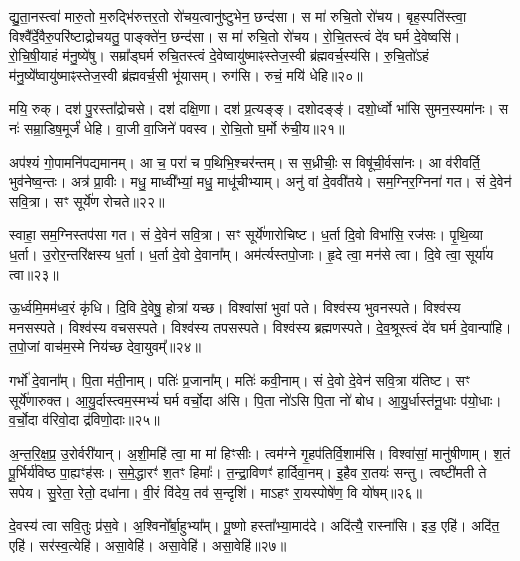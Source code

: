 द्यु॒ता॒नस्त्वा॑ मारु॒तो म॒रुद्भि॑रुत्तर॒तो रो॑चय॒त्वानु॑ष्टुभेन॒ छन्द॑सा। 
स मा॑ रुचि॒तो रो॑चय। 
बृह॒स्पति॑स्त्वा॒ विश्वै᳚र्दे॒वैरु॒परि॑ष्टाद्रोचयतु॒ पाङ्क्ते॑न॒ छन्द॑सा। 
स मा॑ रुचि॒तो रो॑चय। 
रो॒चि॒तस्त्वं दे॑व घर्म दे॒वेष्वसि॑। 
रो॒चि॒षी॒याहं म॑नु॒ष्ये॑षु। 
सम्रा᳚ड्घर्म रुचि॒तस्त्वं दे॒वेष्वायु॑ष्माꣴस्तेज॒स्वी ब्र॑ह्मवर्च॒स्य॑सि। 
रु॒चि॒तो॑ऽहं म॑नु॒ष्ये᳚ष्वायु॑ष्माꣴस्तेज॒स्वी ब्र॑ह्मवर्च॒सी भू॑यासम्। 
रुग॑सि। 
रुचं॒ मयि॑ धेहि॥२०॥

मयि॒ रुक्। 
दश॑ पु॒रस्ता᳚द्रोचसे। 
दश॑ दक्षि॒णा। 
दश॑ प्र॒त्यङ्ङ्। 
दशोदङ्ङ्॑। 
दशो॒र्ध्वो भा॑सि सुमन॒स्यमा॑नः। 
स नः॑ सम्रा॒डिष॒मूर्जं॑ धेहि। 
वा॒जी वा॒जिने॑ पवस्व। 
रो॒चि॒तो घ॒र्मो रु॑ची॒य॥२१॥
\anuvakamend[रो॒च॒य॒ धे॒हि॒ नव॑ च]

अप॑श्यं गो॒पामनि॑पद्यमानम्। 
आ च॒ परा॑ च प॒थिभि॒श्चर॑न्तम्। 
स स॒ध्रीचीः॒ स विषू॑ची॒र्वसा॑नः। 
आ व॑रीवर्ति॒ भुव॑नेष्व॒न्तः। 
अत्र॑ प्रा॒वीः। 
मधु॒ माध्वी᳚भ्यां॒ मधु॒ माधू॑चीभ्याम्। 
अनु॑ वां दे॒ववी॑तये। 
सम॒ग्निर॒ग्निना॑ गत। 
सं दे॒वेन॑ सवि॒त्रा। 
सꣳ सूर्ये॑ण रोचते॥२२॥

स्वाहा॒ सम॒ग्निस्तप॑सा गत। 
सं दे॒वेन॑ सवि॒त्रा। 
सꣳ सूर्ये॑णारोचिष्ट। 
ध॒र्ता दि॒वो विभा॑सि॒ रज॑सः। 
पृ॒थि॒व्या ध॒र्ता। 
उ॒रोर॒न्तरि॑क्षस्य ध॒र्ता। 
ध॒र्ता दे॒वो दे॒वाना᳚म्। 
अम॑र्त्यस्तपो॒जाः। 
हृ॒दे त्वा॒ मन॑से त्वा। 
दि॒वे त्वा॒ सूर्या॑य त्वा॥२३॥

ऊ॒र्ध्वमि॒मम॑ध्व॒रं कृ॑धि। 
दि॒वि दे॒वेषु॒ होत्रा॑ यच्छ। 
विश्वा॑सां भुवां पते। 
विश्व॑स्य भुवनस्पते। 
विश्व॑स्य मनसस्पते। 
विश्व॑स्य वचसस्पते। 
विश्व॑स्य तपसस्पते। 
विश्व॑स्य ब्रह्मणस्पते। 
दे॒व॒श्रूस्त्वं दे॑व घर्म दे॒वान्पा॑हि। 
त॒पो॒जां वाच॑म॒स्मे निय॑च्छ देवा॒युवम्᳚॥२४॥

गर्भो॑ दे॒वाना᳚म्। 
पि॒ता म॑ती॒नाम्। 
पतिः॑ प्र॒जाना᳚म्। 
मतिः॑ कवी॒नाम्। 
सं दे॒वो दे॒वेन॑ सवि॒त्रा य॑तिष्ट। 
सꣳ सूर्ये॑णारुक्त। 
आ॒यु॒र्दास्त्वम॒स्मभ्यं॑ घर्म वर्चो॒दा अ॑सि। 
पि॒ता नो॑ऽसि पि॒ता नो॑ बोध। 
आ॒यु॒र्धास्त॑नू॒धाः प॑यो॒धाः। 
व॒र्चो॒दा व॑रिवो॒दा द्र॑विणो॒दाः॥२५॥

अ॒न्त॒रि॒क्ष॒प्र॒ उ॒रोर्वरी॑यान्। 
अ॒शी॒महि॑ त्वा॒ मा मा॑ हिꣳसीः। 
त्वम॑ग्ने गृ॒हप॑तिर्वि॒शाम॑सि। 
विश्वा॑सां॒ मानु॑षीणाम्। 
श॒तं पू॒र्भिर्य॑विष्ठ पा॒ह्यꣳह॑सः। 
स॒मे॒द्धारꣳ॑ श॒तꣳ हिमाः᳚। 
त॒न्द्रा॒विणꣳ॑ हार्दिवा॒नम्। 
इ॒हैव रा॒तयः॑ सन्तु। 
त्वष्टी॑मती ते सपेय। 
सु॒रेता॒ रेतो॒ दधा॑ना। 
वी॒रं  वि॑देय॒ तव॑ स॒न्दृशि॑। 
माऽहꣳ रा॒यस्पोषे॑ण॒ वि यो॑षम्॥२६॥
\anuvakamend[रो॒च॒ते॒ सूर्या॑य त्वा देवा॒युवं॑ द्रविणो॒दा दधा॑ना॒ द्वे च॑]


दे॒वस्य॑ त्वा सवि॒तुः प्र॑स॒वे। 
अ॒श्विनो᳚र्बा॒हुभ्या᳚म्। 
पू॒ष्णो हस्ता᳚भ्या॒माद॑दे। 
अदि॑त्यै॒ रास्ना॑सि। 
इड॒ एहि॑। 
अदि॑त॒ एहि॑। 
सर॑स्व॒त्येहि॑। 
असा॒वेहि॑। 
असा॒वेहि॑। 
असा॒वेहि॑॥२७॥

